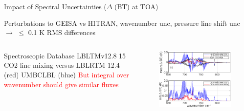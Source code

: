 \documentclass[10pt,t]{beamer}
\begin{document}
\begin{frame}{Impact of Spectral Uncertainties ($\Delta$ (BT) at TOA)}

\begin{block}{Perturbations to}
GEISA vs HITRAN, wavenumber unc, pressure line shift unc \newline $\rightarrow$ $\le$ 0.1 K RMS differences
\end{block}

\vspace{-0.1in}
\begin{columns}

\begin{column}{0.55\columnwidth}
\begin{block}{Spectroscopic Database}
LBLTMv12.8 15 \um CO2 line mixing versus \newline
LBLRTM 12.4 (red) UMBCLBL (blue) \newline
\textcolor{red}{But integral over wavenumber should give similar fluxes}
\end{block}
\end{column}

\begin{column}{0.55\columnwidth}
\begin{figure}
\begin{center}
\includegraphics[width=1.005\textwidth]{NEWFIGS/co2_linemix_flavorsV2.pdf}
\end{center}
\end{figure}
\end{column}
\end{columns}
\end{frame}
\end{document}
